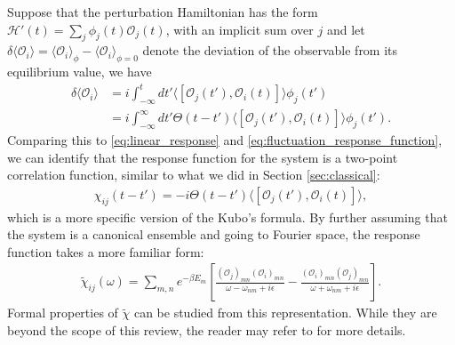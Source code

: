 \documentclass[reprint,
nofootinbib,
amsmath,amssymb,
aps]{revtex4-1}
\newcommand{\be}{\beta}
\newcommand{\f}[2]{\frac{#1}{#2}}
\newcommand{\lb}{\left[}
\newcommand{\rb}{\right]}
\begin{document}
Suppose that the perturbation Hamiltonian has the form $\mathcal{H}'(t) = \sum_j \phi_j (t) \mathcal{O}_j(t)$, with an implicit sum over $j$ and let $\delta \langle \mathcal{O}_i \rangle = \langle \mathcal{O}_i \rangle_\phi - \langle  \mathcal{O}_i \rangle_{\phi = 0}$ denote the deviation of the observable from its equilibrium value, we have
\begin{align*}
\delta \langle \mathcal{O}_i \rangle 
&=  i \int_{-\infty}^t dt' \langle  [ \mathcal{O}_j(t'), \mathcal{O}_i(t)   ] \rangle \phi_j(t') \\
&= i \int_{-\infty}^\infty dt' \Theta(t-t') \langle  [ \mathcal{O}_j(t'), \mathcal{O}_i(t)   ] \rangle \phi_j(t').
\end{align*} 
Comparing this to \eqref{eq:linear_response} and \eqref{eq:fluctuation_response_function}, we can identify that the response function for the system is a two-point correlation function, similar to what we did in Section \ref{sec:classical}:
\begin{align}\label{eq:corr_func}
\chi_{ij}(t-t') = -i \Theta(t-t') \langle  [ \mathcal{O}_j(t'), \mathcal{O}_i(t)   ] \rangle,
\end{align}
which is a more specific version of the Kubo's formula. By further assuming that the system is a canonical ensemble and going to Fourier space, the response function takes a more familiar form:
\begin{align*}
\widetilde{\chi}_{ij}(\omega) = \sum_{m,n} e^{-\be E_m} \lb 
\f{(\mathcal{O}_j)_{mn}(\mathcal{O}_i)_{mn}}{\omega - \omega_{nm} + i\epsilon} 
- 
\f{(\mathcal{O}_i)_{mn}(\mathcal{O}_j)_{mn}}{\omega + \omega_{nm} + i\epsilon} 
\rb.
\end{align*}
Formal properties of $\widetilde{\chi}$ can be studied from this representation. While they are beyond the scope of this review, the reader may refer to \cite{pitaevskii2016bose} for more details.  
\end{document}
